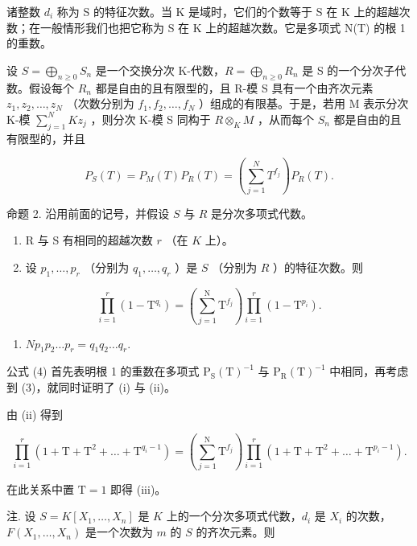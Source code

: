 诸整数 \(d_{i}\) 称为 S 的特征次数。当 K 是域时，它们的个数等于 S 在 K 上的超越次数；在一般情形我们也把它称为 S 在 K 上的超越次数。它是多项式 N(T) 的根 1 的重数。

设 \(S = \bigoplus_{n \geqslant 0} S_n\) 是一个交换分次 K-代数，\(R = \bigoplus_{n \geqslant 0} R_n\) 是 S 的一个分次子代数。假设每个 \(R_n\) 都是自由的且有限型的，且 R-模 S 具有一个由齐次元素 \(z_1, z_2, \ldots, z_N\) （次数分别为 \(f_1, f_2, \ldots, f_N\) ）组成的有限基。于是，若用 M 表示分次 K-模 \(\sum_{j=1}^{N} Kz_j\) ，则分次 K-模 S 同构于 \(R \otimes_K M\) ，从而每个 \(S_n\) 都是自由的且有限型的，并且

\[
P _ {S} (T) = P _ {M} (T) P _ {R} (T) = \left(\sum_ {j = 1} ^ {N} T ^ {f _ {j}}\right) P _ {R} (T).\tag{4}
\]

命题 2. 沿用前面的记号，并假设 \(S\) 与 \(R\) 是分次多项式代数。

\begin{enumerate}
\def\labelenumi{(\roman{enumi})}
\item
  R 与 S 有相同的超越次数 \(r\) （在 \(K\) 上）。
\item
  设 \(p_1, \ldots, p_r\) （分别为 \(q_1, \ldots, q_r\) ）是 \(S\) （分别为 \(R\) ）的特征次数。则
\end{enumerate}

\[
\prod_ {i = 1} ^ {r} \left(1 - \mathrm{T} ^ {q _ {i}}\right) = \left(\sum_ {j = 1} ^ {\mathrm{N}} \mathrm{T} ^ {f _ {j}}\right) \prod_ {i = 1} ^ {r} \left(1 - \mathrm{T} ^ {p _ {i}}\right).
\]

\begin{enumerate}
\def\labelenumi{(\roman{enumi})}
\setcounter{enumi}{2}
\tightlist
\item
  \(Np_{1}p_{2}\ldots p_{r}=q_{1}q_{2}\ldots q_{r}.\)
\end{enumerate}

公式 (4) 首先表明根 1 的重数在多项式 \(\mathrm{P}_{\mathrm{S}}(\mathrm{T})^{-1}\) 与 \(\mathrm{P}_{\mathrm{R}}(\mathrm{T})^{-1}\) 中相同，再考虑到 (3)，就同时证明了 (i) 与 (ii)。

由 (ii) 得到

\[
\prod_ {i = 1} ^ {r} \left(1 + \mathrm{T} + \mathrm{T} ^ {2} + \dots + \mathrm{T} ^ {q _ {i} - 1}\right) = \left(\sum_ {j = 1} ^ {\mathrm{N}} \mathrm{T} ^ {f _ {j}}\right) \prod_ {i = 1} ^ {r} \left(1 + \mathrm{T} + \mathrm{T} ^ {2} + \dots + \mathrm{T} ^ {p _ {i} - 1}\right).
\]

在此关系中置 \(\mathrm{T} = 1\) 即得 (iii)。

注. 设 \(S = K[X_1, \ldots, X_n]\) 是 \(K\) 上的一个分次多项式代数，\(d_i\) 是 \(X_i\) 的次数，\(F(X_1, \ldots, X_n)\) 是一个次数为 \(m\) 的 \(S\) 的齐次元素。则

